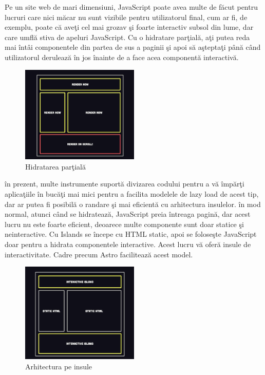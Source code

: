 \documentclass[12pt, a4paper]{report}
\begin{document}
Pe un site web de mari dimensiuni, JavaScript poate avea multe de f\u acut pentru lucruri care nici m\u acar nu sunt vizibile pentru utilizatorul final, cum ar fi, de exemplu, poate c\u a ave\c ti cel mai grozav \c si foarte interactiv subsol din lume, dar care umfl\u a stiva de apeluri JavaScript. Cu o hidratare par\c tial\u a, a\c ti putea reda mai \^ int\^ ai componentele din partea de sus a paginii \c si apoi s\u a a\c stepta\c ti p\^ an\u a c\^ and utilizatorul deruleaz\u a \^ in jos \^ inainte de a face acea component\u a interactiv\u a.

\begin{figure}[htbp]
	\centering
	\includegraphics[width=0.5\textwidth]{42.png}
	\caption{Hidratarea par\c tial\u a}
	\label{fig:partial hydration}
\end{figure}

\^ in prezent, multe instrumente suport\u a divizarea codului pentru a v\u a \^ imp\u ar\c ti aplica\c tiile \^ in buc\u a\c ti mai mici pentru a facilita modelele de lazy load de acest tip, dar ar putea fi posibil\u a o randare \c si mai eficient\u a cu arhitectura insulelor. \^ in mod normal, atunci c\^ and se hidrateaz\u a, JavaScript preia \^ intreaga pagin\u a, dar acest lucru nu este foarte eficient, deoarece multe componente sunt doar statice \c si neinteractive. Cu Islands se \^ incepe cu HTML static, apoi se folose\c ste JavaScript doar pentru a hidrata componentele interactive. Acest lucru v\u a ofer\u a insule de interactivitate. Cadre precum Astro faciliteaz\u a acest model.

\begin{figure}[htbp]
	\centering
	\includegraphics[width=0.5\textwidth]{43.png}
	\caption{Arhitectura pe insule}
	\label{fig:island architecture}
\end{figure}
\end{document}
